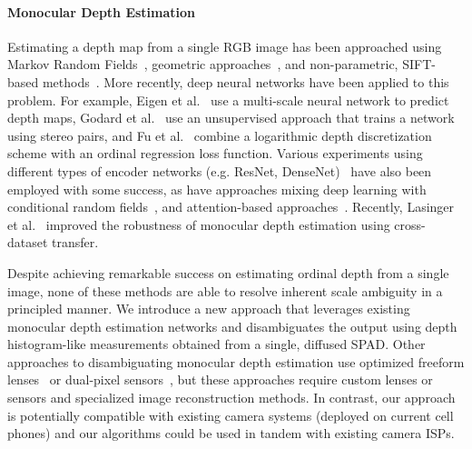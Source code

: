

\paragraph{Monocular Depth Estimation}
%
Estimating a depth map from a single RGB image has been approached using Markov Random Fields~\cite{Saxena2006}, geometric approaches~\cite{Hoiem2005}, and non-parametric, SIFT-based methods~\cite{Karsch2014}. More recently, deep neural networks have been applied to this problem. For example, Eigen et al.~\cite{Eigen2014} use a multi-scale neural network to
predict depth maps, Godard et al.~\cite{Godard2017} use an unsupervised approach that trains a network using stereo pairs, and Fu et al.~\cite{Fu2018} combine a logarithmic depth discretization scheme with an ordinal regression loss function. Various experiments using different types of encoder networks (e.g. ResNet, DenseNet)~\cite{Alhashim2018,Laina2016} have also been employed with some success, as have approaches mixing deep learning with conditional random fields~\cite{Xu2017}, and attention-based approaches~\cite{Hao2018,Xu2018}. Recently, Lasinger et al.~\cite{Lasinger:2019} improved the robustness of monocular depth estimation using cross-dataset transfer.

Despite achieving remarkable success on estimating ordinal depth from a single image, none of these methods are able to resolve inherent scale ambiguity in a principled manner. We introduce a new approach that leverages existing monocular depth estimation networks and disambiguates the output using depth histogram-like measurements obtained from a single, diffused SPAD. Other approaches to disambiguating monocular depth estimation use optimized freeform lenses~\cite{Chang:2019:DeepOptics3D,Wu:2019} or dual-pixel sensors~\cite{Garg:2019}, but these approaches require custom lenses or sensors and specialized image reconstruction methods. In contrast, our approach is potentially compatible with existing camera systems (\eg deployed on current cell phones) and our algorithms could be used in tandem with existing camera ISPs.

